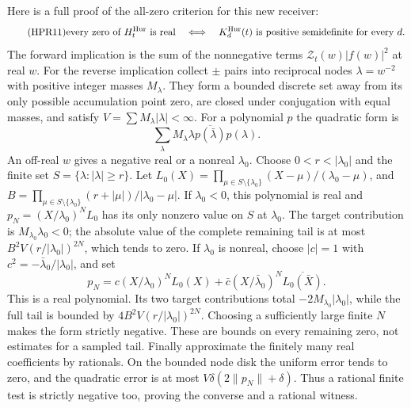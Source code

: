 Here is a full proof of the all-zero criterion for this new receiver:
\begin{equation}\tag{HPR11}
 \text{every zero of }H_t^{\mathrm{Hur}}\text{ is real}
 \quad\Longleftrightarrow\quad
 K_d^{\rm Hur}(t)\text{ is positive semidefinite for every }d.
\end{equation}
The forward implication is the sum of the nonnegative terms
$\mathcal Z_t(w)|f(w)|^2$ at real $w$.
For the reverse implication collect $\pm$ pairs into reciprocal nodes
$\lambda=w^{-2}$ with positive integer masses $M_\lambda$.
They form a bounded discrete set away from its only possible accumulation
point zero, are closed under conjugation with equal masses, and satisfy
$V=\sum M_\lambda|\lambda|<\infty$.
For a polynomial $p$ the quadratic form is
\[
 \sum_\lambda M_\lambda\lambda
                     \overline{p(\bar\lambda)}p(\lambda).
\]
An off-real $w$ gives a negative real or a nonreal $\lambda_0$.
Choose $0<r<|\lambda_0|$ and the finite set
$S=\{\lambda:|\lambda|\ge r\}$.
Let $L_0(X)=\prod_{\mu\in S\setminus\{\lambda_0\}}
(X-\mu)/(\lambda_0-\mu)$, and
$B=\prod_{\mu\in S\setminus\{\lambda_0\}}
(r+|\mu|)/|\lambda_0-\mu|$.
If $\lambda_0<0$, this polynomial is real and
$p_N=(X/\lambda_0)^N L_0$ has its only nonzero value on $S$
at $\lambda_0$. The target contribution is $M_{\lambda_0}\lambda_0<0$;
the absolute value of the complete remaining tail is at most
$B^2V(r/|\lambda_0|)^{2N}$, which tends to zero.
If $\lambda_0$ is nonreal, choose $|c|=1$ with
$c^2=-\bar\lambda_0/|\lambda_0|$, and set
\[
 p_N=c(X/\lambda_0)^N L_0(X)
       +\bar c(X/\bar\lambda_0)^N\overline{L_0(\bar X)}.
\]
This is a real polynomial. Its two target contributions total
$-2M_{\lambda_0}|\lambda_0|$, while the full tail is bounded by
$4B^2V(r/|\lambda_0|)^{2N}$. Choosing a sufficiently large finite
$N$ makes the form strictly negative. These are bounds on every
remaining zero, not estimates for a sampled tail. Finally approximate
the finitely many real coefficients by rationals. On the bounded node
disk the uniform error tends to zero, and the quadratic error is at
most $V\delta(2\|p_N\|+\delta)$. Thus a rational finite test is
strictly negative too, proving the converse and a rational witness.

